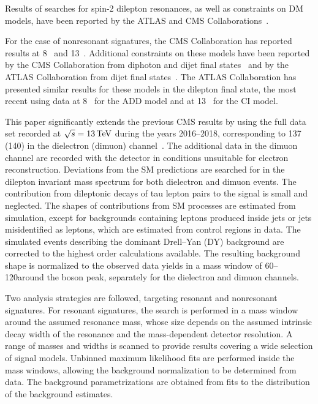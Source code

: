 \documentclass[11pt,twoside,a4paper,cmspaper,final,collab]{cms-tdr}
\begin{document}
Results of searches for spin-2 dilepton resonances, as well as constraints on DM models, have been reported by the ATLAS and CMS Collaborations~\cite{Chatrchyan:2012oaa,Sirunyan:2018exx,Aad:2014cka,Aaboud:2019yqu}.

For the case of nonresonant signatures, the CMS Collaboration has reported results at 8~\cite{Khachatryan:2014fba} and 13\TeV~\cite{Sirunyan:2018ipj}.
Additional constraints on these models have been reported by the CMS Collaboration from diphoton and dijet final states~\cite{Sirunyan:2018wnk,Sirunyan:2018wcm} and by the ATLAS Collaboration from dijet final states~\cite{Aaboud:2017yvp}.
The ATLAS Collaboration has presented similar results for these models in the dilepton final state, the most recent using data at 8\TeV~\cite{Aad:2014wca} for the ADD model and at 13\TeV~\cite{Aad:2020otl} for the CI model.

This paper significantly extends the previous CMS results by using the full data set recorded at $\sqrt{s} = 13\,\text{Te\hspace{-.08em}V}$ during the years 2016--2018, corresponding to 137 (140) \fbinv in the dielectron (dimuon) channel~\cite{CMS-PAS-LUM-17-001,CMS-PAS-LUM-17-004,CMS-PAS-LUM-18-002}. The additional data in the dimuon channel are recorded with the detector in conditions unsuitable for electron reconstruction.  Deviations from the SM predictions are searched for in the dilepton invariant mass spectrum for both dielectron and dimuon events. The contribution from dileptonic decays of tau lepton pairs to the signal is small and neglected. The shapes of contributions from SM processes are estimated from simulation, except for backgrounds containing leptons produced inside jets or jets misidentified as leptons, which are estimated from control regions in data. The simulated events describing the dominant Drell--Yan (DY) background are corrected to the highest order calculations available. The resulting  background shape is normalized to the observed data yields in a mass window of 60--120\GeV around the \PZ boson peak, separately for the dielectron and dimuon channels. 

Two analysis strategies are followed, targeting resonant and nonresonant signatures. For resonant signatures, the search is performed in a mass window around the assumed resonance mass, whose size depends on the assumed intrinsic decay width of the resonance and the mass-dependent detector resolution.  A range of masses and widths is scanned to provide results covering a wide selection of signal models. 
Unbinned maximum likelihood fits are performed inside the mass windows, allowing the background normalization to be determined from data. The background parametrizations are obtained from fits to the \mll distribution of the background estimates.
\end{document}
